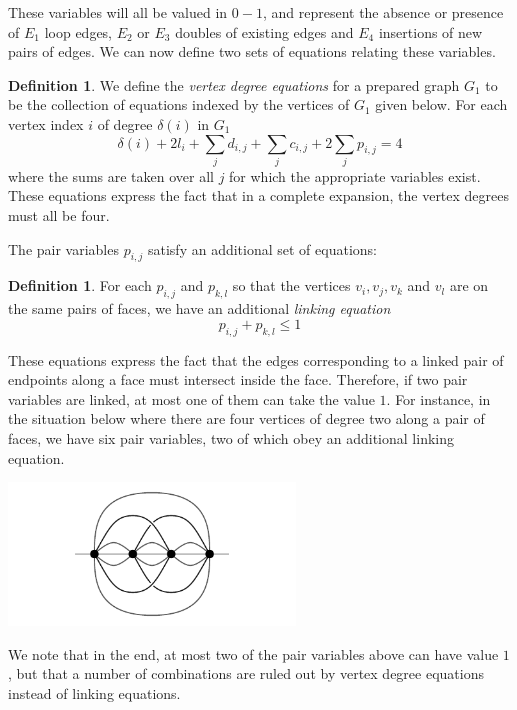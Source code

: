 \documentclass[amsmath,secnumarabic,floatfix,amssymb,nofootinbib,nobibnotes,letterpaper,11pt,tightenlines,showkeys]{revtex4}
\theoremstyle{definition}
\newtheorem{definition}[theorem]{Definition}
\newcommand{\loopinsert}{E_1}
\newcommand{\edgedouble}{E_2}
\newcommand{\cutedgedouble}{E_3}
\newcommand{\pairinsert}{E_4}
\begin{document}
These variables will all be valued in $0-1$, and represent the absence or presence of $\loopinsert$ loop edges, $\edgedouble$ or $\cutedgedouble$ doubles of existing edges and $\pairinsert$ insertions of new pairs of edges. 
We can now define two sets of equations relating these variables.

\begin{definition}
We define the \emph{vertex degree equations} for a prepared graph $G_1$ to be the collection of equations indexed by the vertices of $G_1$ given below. For each vertex index $i$ of degree $\delta(i)$ in $G_1$
\begin{equation*}
\delta(i) + 2 l_i + \sum_j d_{i,j} + \sum_j c_{i,j} + 2 \sum_j p_{i,j} = 4
\end{equation*}
where the sums are taken over all $j$ for which the appropriate variables exist. These equations express the fact that in a complete expansion, the vertex degrees must all be four. 
\end{definition}

The pair variables $p_{i,j}$ satisfy an additional set of equations:
\begin{definition}
For each $p_{i,j}$ and $p_{k,l}$ so that the vertices $v_i, v_j, v_k$ and $v_l$ are on the same pairs of faces, we have an additional \emph{linking equation}
\begin{equation*}
p_{i,j} + p_{k,l} \leq 1
\end{equation*}
\end{definition}

These equations express the fact that the edges corresponding to a linked pair of endpoints along a face must intersect inside the face. Therefore, if two pair variables are linked, at most one of them can take the value $1$. For instance, in the situation below where there are four vertices of degree two along a pair of faces, we have six pair variables, two of which obey an additional linking equation. 
\begin{center}
\includegraphics[height=1.5in]{linked-ghost-pairs}
\end{center}
We note that in the end, at most two of the pair variables above can have value $1$, but that a number of combinations are ruled out by vertex degree equations instead of linking equations.
\end{document}
